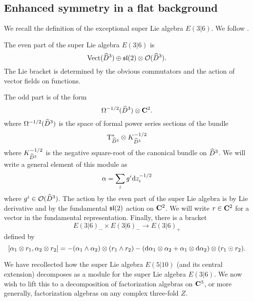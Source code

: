 \documentclass[11pt]{amsart}%
\begin{document}
\subsection{Enhanced symmetry in a flat background}

\parsec[s:e36]

We recall the definition of the exceptional super Lie algebra $E(3|6)$. 
We follow \cite{Kac_class, KacRudakov}.

The even part of the super Lie algebra $E(3|6)$ is 
\[
\Vect(\Hat{D}^3) \oplus \lie{sl}(2) \otimes \cO(\Hat{D}^3) .
\]
The Lie bracket is determined by the obvious commutators and the action of vector fields on functions. 

The odd part is of the form
\[
\Omega^{-1/2}(\Hat{D}^3) \otimes \C^2 .
\]
where $\Omega^{-1/2}(\Hat{D}^3)$ is the space of formal power series sections of the bundle
\[
\T_{\Hat{D}^3}^{*} \otimes K_{\Hat{D}^3}^{-1/2}
\]
where $K_{\Hat{D}^3}^{-1/2}$ is the negative square-root of the canonical bundle on $\Hat{D}^3$. 
We will write a general element of this module as 
\[
\alpha = \sum_i g^i \d z_i^{-1/2} 
\]
where $g^i \in \cO(\Hat{D}^3)$. 
The action by the even part of the super Lie algebra is by Lie derivative and by the fundamental $\lie{sl}(2)$ action on $\C^2$.
We will write $r \in \C^2$ for a vector in the fundamental representation.
Finally, there is a bracket 
\[
E(3|6)_- \times E(3|6)_- \to E(3|6)_+
\]
defined by
\[
[\alpha_1 \otimes r_1, \alpha_2 \otimes r_2] = - (\alpha_1 \wedge \alpha_2) \otimes (r_1 \wedge r_2) - (\d \alpha_1 \otimes \alpha_2 + \alpha_1 \otimes \d \alpha_2) \otimes (r_1 \odot r_2) .
\]


\parsec[s:weight]


\parsec[s:locallieE510]

We have recollected how the super Lie algebra $E(5|10)$ (and its central extension) decomposes as a module for the super Lie algebra $E(3|6)$. 
We now wish to lift this to a decomposition of factorization algebras on $\C^3$, or more generally, factorization algebras on any complex three-fold $Z$. 
\end{document}
